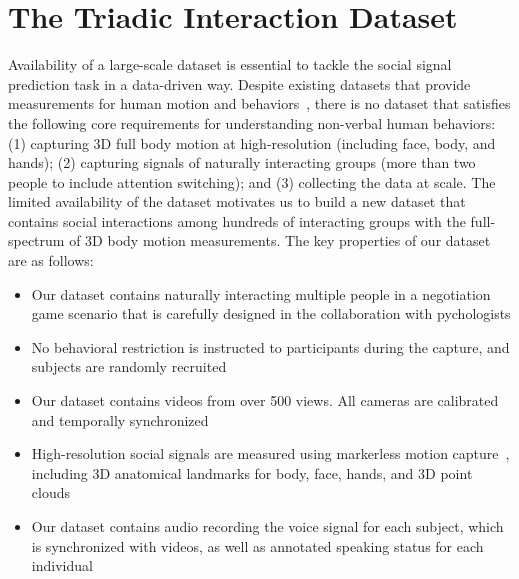 
\chapter{The Triadic Interaction Dataset}
\label{chapter:dataset}
Availability of a large-scale dataset is essential to tackle the social signal prediction task in a data-driven way. Despite existing datasets that provide measurements for human motion and behaviors~\cite{carletta2005ami, Lepri-12, Zen-10,Cristani-11, SALSA-15, h36m_pami}, there is no dataset that satisfies the following core requirements for understanding non-verbal human behaviors: (1) capturing 3D full body motion at high-resolution (including face, body, and hands); (2) capturing signals of naturally interacting groups (more than two people to include attention switching); and (3) collecting the data at scale. The limited availability of the dataset motivates us to build a new dataset that contains social interactions among hundreds of interacting groups with the full-spectrum of 3D body motion measurements. The key properties of our dataset are as follows:
\begin{itemize}
	\item Our dataset contains naturally interacting multiple people in a negotiation game scenario that is carefully designed in the collaboration with pychologists
	\item No behavioral restriction is instructed to participants during the capture, and subjects are randomly recruited
	\item Our dataset contains videos from over 500 views. All cameras are calibrated and temporally synchronized
	\item High-resolution social signals are measured using markerless motion capture~\cite{joo2017panoptic, joo2018}, including 3D anatomical landmarks for body, face, hands, and 3D point clouds
	\item Our dataset contains audio recording the voice signal for each subject, which is synchronized with videos, as well as annotated speaking status for each individual
\end{itemize}

